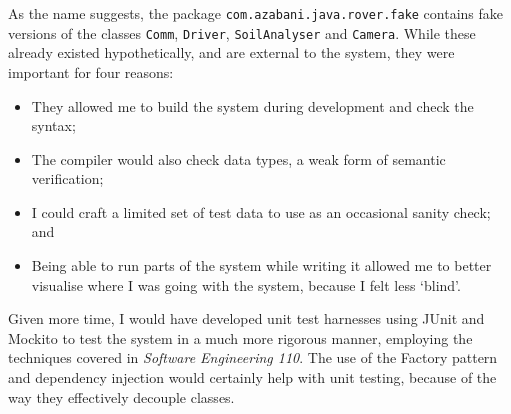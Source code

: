 \documentclass[a4paper,titlepage,12pt]{article}
\begin{document}
As the name suggests, the package \texttt{com.azabani.java.rover.fake}
contains fake versions of the classes \texttt{Comm}, \texttt{Driver},
\texttt{SoilAnalyser} and \texttt{Camera}. While these already
existed hypothetically, and are external to the system, they were
important for four reasons:

\begin{itemize}
	\item They allowed me to build the system during development
	      and check the syntax;
	\item The compiler would also check data types, a weak form of
	      semantic verification;
	\item I could craft a limited set of test data to use as an
	      occasional sanity check; and
	\item Being able to run parts of the system while writing it
	      allowed me to better visualise where I was going with the
	      system, because I felt less `blind'.
\end{itemize}

Given more time, I would have developed unit test harnesses using JUnit
and Mockito to test the system in a much more rigorous manner,
employing the techniques covered in \textit{Software Engineering 110}.
The use of the Factory pattern and dependency injection would certainly
help with unit testing, because of the way they effectively decouple
classes.
\end{document}
